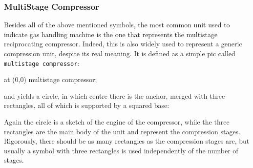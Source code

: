 \documentclass[12pt]{article}						%
\newcommand*{\chpn}[1]{\texttt{#1}}				%
\newcommand*{\chpp}[1]{\texttt{#1}}				%
\begin{document}
\subsubsection{MultiStage Compressor}

Besides all of the above mentioned symbols, the most common unit used to indicate
gas handling machine is the one that represents the multistage reciprocating
compressor. Indeed, this is also widely used to represent a generic compression
unit, despite its real meaning. It is defined as a simple pic called
\chpp{multistage compressor}:
\begin{chpcode}
	\pic at (0,0) {multistage compressor};
\end{chpcode}
and yields a circle, in which centre there is the anchor, merged with three
rectangles, all of which is supported by a squared base:
\begin{center}
\end{center}
Again the circle is a sketch of the engine of the compressor, while the three
rectangles are the main body of the unit and represent the compression stages.
Rigorously, there should be as many rectangles as the compression stages are, but
usually a symbol with three rectangles is used independently of the number of
stages.
\end{document}

